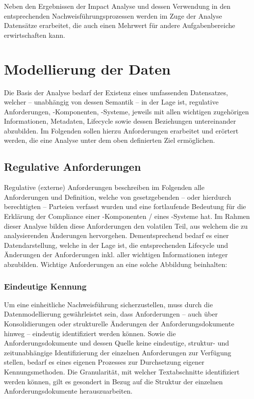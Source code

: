     \medskip
    Neben den Ergebnissen der Impact Analyse und dessen Verwendung in den entsprechenden Nachweisführungsprozessen werden im Zuge der Analyse Datensätze erarbeitet, die auch einen Mehrwert für andere Aufgabenbereiche erwirtschaften kann. 


\pagebreak
\section{Modellierung der Daten} 

    Die Basis der Analyse bedarf der Existenz eines umfassenden Datensatzes, welcher -- unabhängig von dessen Semantik -- in der Lage ist, regulative Anforderungen, \atmans-Komponenten, \atmans-Systeme, jeweils mit allen wichtigen zugehörigen Informationen, Metadaten, Lifecycle sowie dessen Beziehungen untereinander abzubilden.
    Im Folgenden sollen hierzu Anforderungen erarbeitet und erörtert werden, die eine Analyse unter dem oben definierten Ziel ermöglichen.

\subsection{Regulative Anforderungen}\label{model_anforderungen}

    Regulative (externe) Anforderungen beschreiben im Folgenden alle Anforderungen und Definition, welche von gesetzgebenden -- oder hierdurch berechtigten -- Parteien verfasst wurden und eine fortlaufende Bedeutung für die Erklärung der Compliance einer \atmans-Komponenten / eines \atmans-Systeme hat.   
    Im Rahmen dieser Analyse bilden diese Anforderungen den volatilen Teil, aus welchem die zu analysierenden Änderungen hervorgehen.
    Dementsprechend bedarf es einer Datendarstellung, welche in der Lage ist, die entsprechenden Lifecycle und Änderungen der Anforderungen inkl. aller wichtigen Informationen integer abzubilden.   
    Wichtige Anforderungen an eine solche Abbildung beinhalten:

\subsubsection{Eindeutige Kennung}

    Um eine einheitliche Nachweisführung sicherzustellen, muss durch die Datenmodellierung gewährleistet sein, dass Anforderungen -- auch über Konsolidierungen oder strukturelle Änderungen der Anforderungsdokumente hinweg -- eindeutig identifiziert werden können.
    Sowie die Anforderungsdokumente und dessen Quelle keine eindeutige, struktur- und zeitunabhängige Identifizierung der  einzelnen Anforderungen zur Verfügung stellen, bedarf es eines eigenen Prozesses zur Durchsetzung eigener Kennungsmethoden.  
    Die Granularität, mit welcher Textabschnitte identifiziert werden können, gilt es gesondert in Bezug auf die Struktur der einzelnen Anforderungsdokumente herauszuarbeiten.

